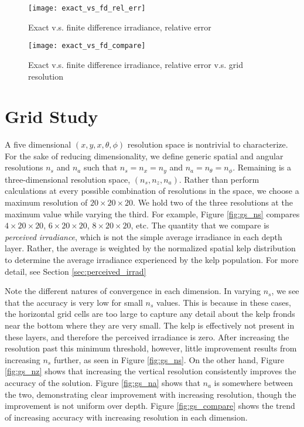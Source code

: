 \begin{figure}[H]
  \centering
  \texttt{[image: exact\_vs\_fd\_rel\_err]}
  \caption{Exact v.s. finite difference irradiance, relative error}
\end{figure}

\begin{figure}[H]
  \centering
  \texttt{[image: exact\_vs\_fd\_compare]}
  \caption{Exact v.s. finite difference irradiance, relative error v.s. grid resolution}
\end{figure}

\section{Grid Study}
A five dimensional $(x,y,x,\theta,\phi)$ resolution space is nontrivial to characterize.
For the sake of reducing dimensionality, we define generic spatial and angular resolutions
$n_s$ and $n_a$ such that $n_s=n_x=n_y$ and $n_a=n_\theta=n_\phi$.
Remaining is a three-dimensional resolution space, $(n_s,n_z,n_a)$.
Rather than perform calculations at every possible combination of resolutions in the space,
we choose a maximum resolution of $20 \times 20 \times 20$.
We hold two of the three resolutions at the maximum value while varying the third.
For example, Figure \ref{fig:gs_ns} compares $4 \times 20 \times 20$, $6 \times 20 \times 20$, $8 \times 20 \times 20$, etc.
The quantity that we compare is \textit{perceived irradiance}, which is not the simple average irradiance in each depth layer.
Rather, the average is weighted by the normalized spatial kelp distribution to determine the average irradiance experienced by the kelp population.
For more detail, see Section \ref{sec:perceived_irrad}

Note the different natures of convergence in each dimension.
In varying $n_s$, we see that the accuracy is very low for small $n_s$ values.
This is because in these cases, the horizontal grid cells are too large to capture any detail
about the kelp fronds near the bottom where they are very small.
The kelp is effectively not present in these layers, and therefore the perceived irradiance is zero.
After increasing the resolution past this minimum threshold, however, little improvement results
from increasing $n_s$ further, as seen in Figure \ref{fig:gs_ns}.
On the other hand, Figure \ref{fig:gs_nz} shows that increasing the vertical resolution
consistently improves the accuracy of the solution.
Figure \ref{fig:gs_na} shows that $n_a$ is somewhere between the two,
demonstrating clear improvement with increasing resolution, though the improvement is not uniform over depth.
Figure \ref{fig:gs_compare} shows the trend of increasing accuracy with increasing resolution in each dimension.

